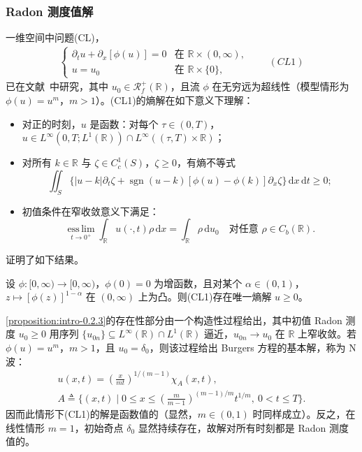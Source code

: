 \documentclass[../main.tex]{subfiles}
\begin{document}
\subsubsection*{Radon 测度值解}\label{subsubsection:intro-radon1d}

一维空间中问题(CL)，
\begin{align*}
\begin{cases}
\partial_t u + \partial_x[\phi(u)] = 0 & \text{在 }\mathbb{R}\times(0,\infty),\\
u=u_0 & \text{在 }\mathbb{R}\times\{0\},
\end{cases}
\qquad(CL1)
\end{align*}
已在文献~\cite{ref67}中研究，其中 $u_0\in\mathscr{R}^+_f(\mathbb{R})$，且流 $\phi$ 在无穷远为超线性（模型情形为 $\phi(u)=u^m$，$m>1$）。(CL1)的熵解在如下意义下理解：
\begin{itemize}
\item 对正的时刻，$u$ 是函数：对每个 $\tau\in(0,T)$，$u\in L^\infty(0,T;L^1(\mathbb{R}))\cap L^\infty((\tau,T)\times\mathbb{R})$；
\item 对所有 $k\in\mathbb{R}$ 与 $\zeta\in C^1_c(S)$，$\zeta\geqslant0$，有熵不等式
\[
\iint_S\{|u-k|\partial_t\zeta + \operatorname{sgn}(u-k)[\phi(u)-\phi(k)]\partial_x\zeta\}\,\mathrm{d}x\,\mathrm{d}t \geqslant 0;
\]
\item 初值条件在窄收敛意义下满足：
\[
\operatorname*{ess\,lim}_{t\to0^+}\int_{\mathbb{R}}u(\cdot,t)\rho\,\mathrm{d}x
= \int_{\mathbb{R}}\rho\,\mathrm{d}u_0
\quad \text{对任意 }\rho\in C_b(\mathbb{R}).
\]
\end{itemize}

证明了如下结果。

\begin{proposition}\label{proposition:intro-0.2.3}
设 $\phi:[0,\infty)\to[0,\infty)$，$\phi(0)=0$ 为增函数，且对某个 $\alpha\in(0,1)$，$z\mapsto[\phi(z)]^{1-\alpha}$ 在 $(0,\infty)$ 上为凸。则(CL1)存在唯一熵解 $u\geqslant0$。
\end{proposition}

\cref{proposition:intro-0.2.3}的存在性部分由一个构造性过程给出，其中初值 Radon 测度 $u_0\geqslant0$ 用序列 $\{u_{0n}\}\subseteq L^\infty(\mathbb{R})\cap L^1(\mathbb{R})$ 逼近，$u_{0n}\to u_0$ 在 $\mathbb{R}$ 上窄收敛。若 $\phi(u)=u^m$，$m>1$，且 $u_0=\delta_0$，则该过程给出 Burgers 方程的基本解，称为 N 波：
\begin{align}
u(x,t) = \left(\frac{x}{mt}\right)^{1/(m-1)}\chi_A(x,t), \label{align:intro-0.16a}\\
A \triangleq  \{(x,t)\mid 0\leqslant x\leqslant\left(\frac{m}{m-1}\right)^{(m-1)/m}t^{1/m},\ 0<t\leqslant T\}. \label{align:intro-0.16b}
\end{align}
因而此情形下(CL1)的解是函数值的（显然，$m\in(0,1)$ 时同样成立）。反之，在线性情形 $m=1$，初始奇点 $\delta_0$ 显然持续存在，故解对所有时刻都是 Radon 测度值的。
\end{document}
